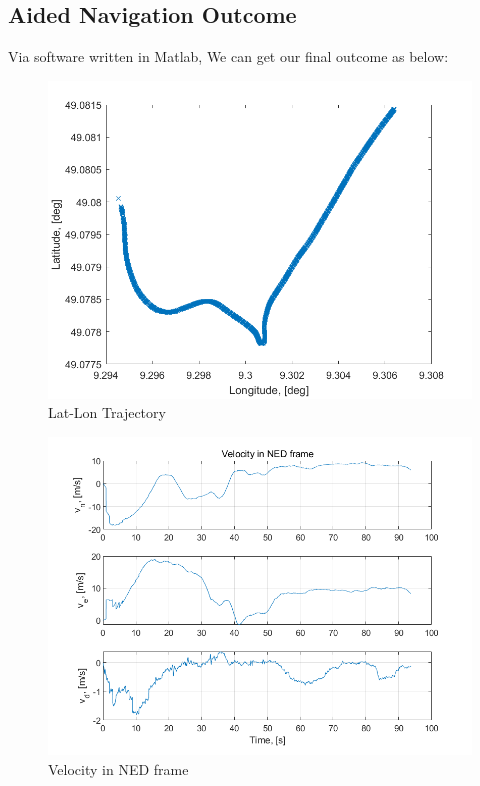 \documentclass[conference]{IEEEtran}
\begin{document}
\subsection{Aided Navigation Outcome}

Via software written in Matlab, We can get our final outcome as below:

\begin{figure}[htbp]
    \centerline{\includegraphics[width=1.0\columnwidth]{fig21.png}}
    \caption{Lat-Lon Trajectory}
\end{figure}

\begin{figure}[htbp]
    \centerline{\includegraphics[width=1.0\columnwidth]{fig22.png}}
    \caption{Velocity in NED frame}
\end{figure}
\end{document}
